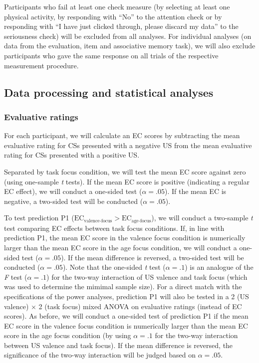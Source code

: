 \documentclass[
  doc,floatsintext]{apa6}
\begin{document}
Participants who fail at least one check measure (by selecting at least one physical activity, by responding with ``No'' to the attention check or by responding with ``I have just clicked through, please discard my data'' to the seriousness check) will be excluded from all analyses.
For individual analyses (on data from the evaluation, item and associative memory task), we will also exclude participants who gave the same response on all trials of the respective measurement procedure.

\hypertarget{data-processing-and-statistical-analyses}{%
\subsection{Data processing and statistical analyses}\label{data-processing-and-statistical-analyses}}

\hypertarget{evaluative-ratings}{%
\subsubsection{Evaluative ratings}\label{evaluative-ratings}}

For each participant, we will calculate an EC scores by subtracting the mean evaluative rating for CSs presented with a negative US from the mean evaluative rating for CSs presented with a positive US.

Separated by task focus condition, we will test the mean EC score against zero (using one-sample \emph{t} tests).
If the mean EC score is positive (indicating a regular EC effect), we will conduct a one-sided test (\(\alpha=.05\)).
If the mean EC is negative, a two-sided test will be conducted (\(\alpha=.05\)).

To test prediction P1 (\(\textrm{EC}_\textrm{valence-focus}>\textrm{EC}_\textrm{age-focus}\)), we will conduct a two-sample \emph{t} test comparing EC effects between task focus conditions.
If, in line with prediction P1, the mean EC score in the valence focus condition is numerically larger than the mean EC score in the age focus condition, we will conduct a one-sided test (\(\alpha=.05\)).
If the mean difference is reversed, a two-sided test will be conducted (\(\alpha=.05\)).
Note that the one-sided \emph{t} test (\(\alpha=.1\)) is an analogue of the \emph{F} test (\(\alpha=.1\)) for the two-way interaction of US valence and task focus (which was used to determine the mimimal sample size).
For a direct match with the specifications of the power analyses, prediction P1 will also be tested in a 2 (US valence) \(\times\) 2 (task focus) mixed ANOVA on evaluative ratings (instead of EC scores).
As before, we will conduct a one-sided test of prediction P1 if the mean EC score in the valence focus condition is numerically larger than the mean EC score in the age focus condition (by using \(\alpha=.1\) for the two-way interaction between US valence and task focus).
If the mean difference is reversed, the significance of the two-way interaction will be judged based on \(\alpha=.05\).
\end{document}
